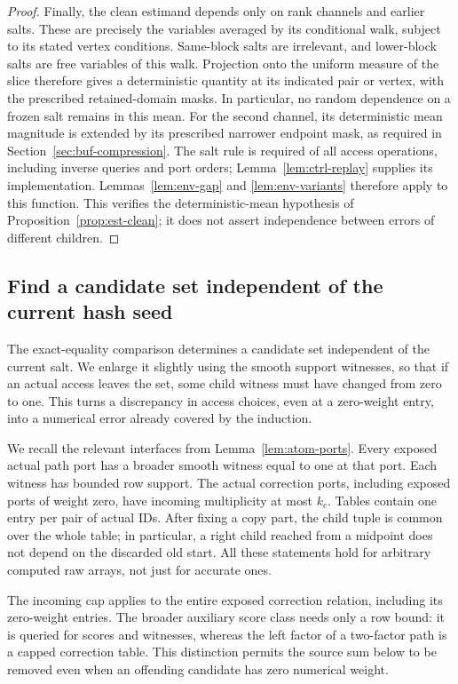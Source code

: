 \documentclass[11pt]{article}
\numberwithin{equation}{section}
\theoremstyle{definition}
\theoremstyle{remark}
\begin{document}
\begin{proof}
Finally, the clean estimand depends only on rank channels and earlier
salts.  These are precisely the variables averaged by its conditional
walk, subject to its stated vertex conditions.  Same-block salts are
irrelevant, and lower-block salts are free variables of this walk.
Projection onto the uniform measure of the slice therefore gives a
deterministic quantity at its indicated pair or vertex, with the
prescribed retained-domain masks.  In particular, no random dependence
on a frozen salt remains in this mean.  For the second channel, its
deterministic mean magnitude is extended by its prescribed narrower
endpoint mask, as required in Section~\ref{sec:buf-compression}.
The salt rule is required of all access operations, including inverse
queries and port orders; Lemma~\ref{lem:ctrl-replay} supplies its
implementation.  Lemmas~\ref{lem:env-gap} and \ref{lem:env-variants}
therefore apply to this function.  This verifies the deterministic-mean
hypothesis of Proposition~\ref{prop:est-clean}; it does not assert
independence between errors of different children.
\end{proof}

\subsection{Find a candidate set independent of the current hash seed}

The exact-equality comparison determines a candidate set independent of the current salt. We enlarge it slightly using the smooth support witnesses, so that if an actual access leaves the set, some child witness must have changed from zero to one. This turns a discrepancy in access choices, even at a zero-weight entry, into a numerical error already covered by the induction.

We recall the relevant interfaces from Lemma~\ref{lem:atom-ports}.
Every exposed actual path port has a broader smooth witness equal to one
at that port.  Each witness has bounded row support.  The actual
correction ports, including exposed ports of weight zero, have incoming
multiplicity at most ${k}_c$.  Tables contain one entry per pair of actual
IDs.  After fixing a copy part, the child tuple is common over the whole
table; in particular, a right child reached from a midpoint does not
depend on the discarded old start.  All these statements hold for
arbitrary computed raw arrays, not just for accurate ones.

The incoming cap applies to the entire exposed correction relation,
including its zero-weight entries.  The broader auxiliary score class
needs only a row bound: it is queried for scores and witnesses, whereas
the left factor of a two-factor path is a capped correction table.
This distinction permits the source sum below to be removed even when
an offending candidate has zero numerical weight.
\end{document}

